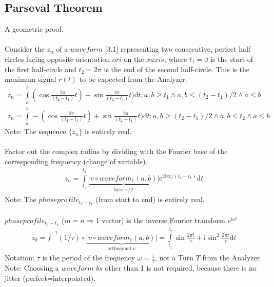 \documentclass{report}
\begin{document}
\subsection{Parseval Theorem}
A geometric proof.\\\\
Consider the $z_{n}$ of a $waveform$ \cite{Grapher}[3.1] representing two consecutive, perfect half circles facing opposite orientation $ori$ on the $xaxis$, where $t_{1}=0$ is the start of the first half-circle and $t_{2}=2\pi$ is the end of the second half-circle. This is the maximum signal $r(t)$ to be expected from the Analyzer.
\begin{align}
z_{n} = \int \limits _{a}^{b}(\cos \frac{2\pi}{(t_{2}-t_{1})}t)+ \sin \frac{2\pi}{(t_{2}-t_{1})}t) \mathrm{d}t;a,b\geq t_{1} \land a,b\leq (t_{2}-t_{1})/2 \land a\leq b\label{eq:5}\\
z_{n} = \int \limits _{a}^{b}-(\cos \frac{2\pi}{(t_{2}-t_{1})}t)+ \sin \frac{2\pi}{(t_{2}-t_{1})}t) \mathrm{d}t;a,b\geq (t_{2}-t_{1})/2 \land a,b\leq t_{2} \land a\leq b
\end{align}
Note: The sequence $\{z_{n}\}$ is entirely real.\\\\
Factor out the complex radius by dividing with the Fourier base of the corresponding frequency (change of variable).
\begin{align}
z_{n} = \int \limits _{t_{1}}^{t_{2}} \underbrace{\lvert \upsilon \circ waveform_{1}(a,b)\rvert}_{\text{here }\pi /2} \mathrm{e}^{\mathrm{i}2\pi t/(t_{2}-t_{1})}\mathrm{d}t\label{eq:4}
\end{align}
Note: The $phaseprofile_{t_{2}-t_{1}}$ (from start to end) is entirely real.\\\\
$phaseprofile_{t_{2}-t_{1}}$ ($m=n\Rightarrow \text{1 vector}$) is the inverse Fourier transform $\mathrm{e}^{\mathrm{i}\omega t}$
\begin{align}
z_{0} = \hat{f}^{-1}(1/\tau)\circ \underbrace{\lvert \upsilon \circ waveform_{1}(a,b)\rvert}_{\text{orthogonal }\upsilon} = \int \limits _{t_{1}}^{t_{2}} \sin \frac{2\pi t}{\tau} + \mathrm{i} \sin^2 \frac{2\pi t}{\tau} \mathrm{d}t
\end{align}
Notation: $\tau$ is the period of the frequency $\omega=\frac{1}{\tau}$, not a Turn $T$ from the Analyzer.\\
Note: Choosing a $waveform$ $bs$ other than 1 is not required, because there is no jitter (perfect=interpolated).\\
\end{document}
